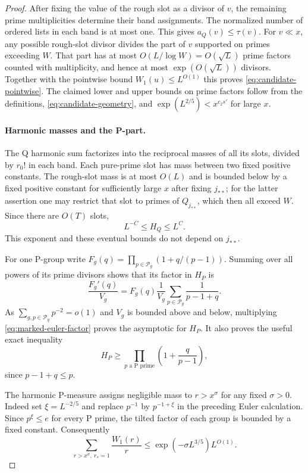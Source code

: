 \begin{proof}
After fixing the value of the rough slot as a divisor of $v$, the
remaining prime multiplicities determine their band assignments.
The normalized number of ordered lists in each band is at most one.
This gives $a_Q(v)\le\tau(v)$. For $v\ll x$, any possible rough-slot
divisor divides the part of $v$ supported on primes exceeding $W$.
That part has at most $O(L/\log W)=O(\sqrt L)$ prime factors counted
with multiplicity, and hence at most $\exp(O(\sqrt L))$ divisors.
Together with the pointwise bound $W_1(u)\le L^{O(1)}$ this proves
\eqref{eq:candidate-pointwise}. The claimed lower and upper bounds on
prime factors follow from the definitions, \eqref{eq:candidate-geometry},
and $\exp(L^{2/5})<x^{c_2s'}$ for large $x$.

\paragraph{Harmonic masses and the P-part.}
The Q harmonic sum factorizes into the reciprocal masses of all its
slots, divided by $r_0!$ in each band. Each pure-prime slot has mass
between two fixed positive constants. The rough-slot mass is at most
$O(L)$ and is bounded below by a fixed positive constant for
sufficiently large $x$ after fixing $j_{**}$; for the latter assertion
one may restrict that slot to primes of $Q_{j_{**}}$, which then all
exceed $W$. Since there are $O(T)$ slots,
\begin{equation}\label{eq:candidate-harmonic-size}
 L^{-C}\le H_Q\le L^C.
\end{equation}
This exponent and these eventual bounds do not depend on $j_{**}$.

For one P-group write
$F_g(q)=\prod_{p\in\mathcal P_g}(1+q/(p-1))$.
Summing over all powers of its prime divisors shows that its factor
in $H_P$ is
\begin{equation}\label{eq:marked-euler-factor}
 \frac{F_g'(q)}{V_g}
  =F_g(q)\frac1{V_g}\sum_{p\in\mathcal P_g}\frac1{p-1+q}.
\end{equation}
As $\sum_{g,p\in\mathcal P_g}p^{-2}=o(1)$ and $V_g$ is bounded
above and below, multiplying \eqref{eq:marked-euler-factor} proves
the asymptotic for $H_P$. It also proves the useful exact inequality
\begin{equation}\label{eq:mask-euler-comparison}
 H_P\ge\prod_{p\text{ a P prime}}\left(1+\frac q{p-1}\right),
\end{equation}
since $p-1+q\le p$.

The harmonic P-measure assigns negligible mass to $r>x^\sigma$ for
any fixed $\sigma>0$. Indeed set $\xi=L^{-2/5}$ and replace $p^{-1}$
by $p^{-1+\xi}$ in the preceding Euler calculation. Since
$p^\xi\le e$ for every P prime, the tilted factor of each group is
bounded by a fixed constant. Consequently
\begin{equation}\label{eq:candidate-P-tail}
 \sum_{r>x^\sigma,\ r_*=1}\frac{W_1(r)}r
 \le \exp(-\sigma L^{3/5})L^{O(1)}.
\end{equation}


\end{proof}
